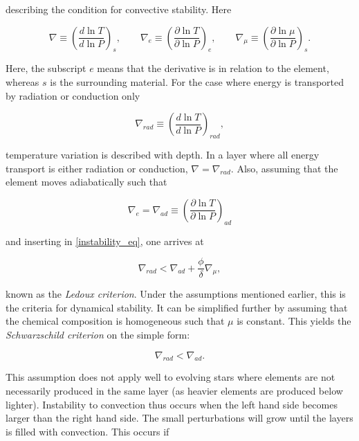 \noindent describing the condition for convective stability. Here

\begin{equation}
    \nabla \equiv \left(\frac{d \ln T}{d \ln P}\right)_s, \qquad \nabla_e \equiv \left(\frac{\partial \ln T}{\partial \ln P}\right)_e, \qquad \nabla_\mu \equiv \left(\frac{\partial \ln \mu}{\partial \ln P}\right)_s.
\end{equation}

\noindent Here, the subscript $e$ means that the derivative is in relation to the element, whereas $s$ is the surrounding material. %
For the case where energy is transported by radiation or conduction only

\begin{equation}
    \nabla_{rad} \equiv \left(\frac{d \ln T}{d \ln P}\right)_{rad}, 
\end{equation}

\noindent temperature variation is described with depth. In a layer where all energy transport is either radiation or conduction, $\nabla = \nabla_{rad}$. Also, assuming that the element moves adiabatically such that 

\begin{equation}
\label{stability}
    \nabla_e = \nabla_{ad} \equiv \left(\frac{\partial \ln T}{\partial \ln P}\right)_{ad}
\end{equation}

\noindent and inserting in \eqref{instability_eq}, one arrives at

\begin{equation}
\label{stability2}
    \nabla_{rad} < \nabla_{ad} + \frac{\phi}{\delta} \nabla_\mu,
\end{equation}

known as the \textit{Ledoux criterion}. Under the assumptions mentioned earlier, this is the criteria for dynamical stability. It can be simplified further by assuming that the chemical composition is homogeneous such that $\mu$ is constant. This yields the \textit{Schwarzschild criterion} on the simple form:

\begin{equation}
\label{stability3}
    \nabla_{rad} < \nabla_{ad}.
\end{equation}

\noindent This assumption does not apply well to evolving stars where elements are not necessarily produced in  the same layer (as heavier elements are produced below lighter). 
Instability to convection thus occurs when the left hand side becomes larger than the right hand side. The small perturbations will grow until the layers is filled with convection. This occurs if

